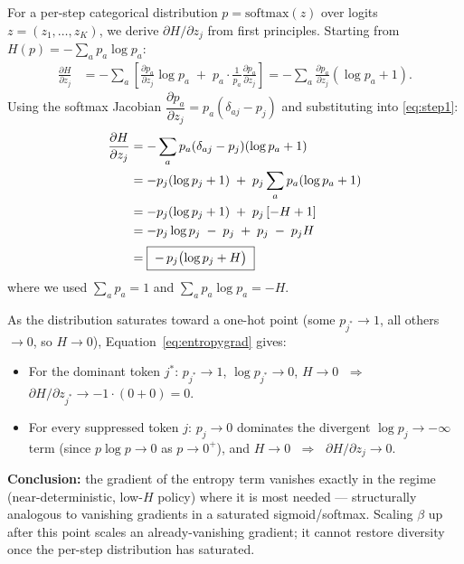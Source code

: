 \documentclass[11pt]{article}
\begin{document}
For a per-step categorical distribution $p = \mathrm{softmax}(z)$ over logits $z = (z_1, \ldots, z_K)$, we derive $\partial H/\partial z_j$ from first principles. Starting from $H(p) = -\sum_a p_a \log p_a$:
\begin{align}
  \frac{\partial H}{\partial z_j}
  &= -\sum_a \left[ \frac{\partial p_a}{\partial z_j} \log p_a \;+\; p_a \cdot \frac{1}{p_a}\frac{\partial p_a}{\partial z_j} \right]
  = -\sum_a \frac{\partial p_a}{\partial z_j}\left(\log p_a + 1\right). \label{eq:step1}
\end{align}
Using the softmax Jacobian $\dfrac{\partial p_a}{\partial z_j} = p_a\left(\delta_{aj} - p_j\right)$ and substituting into \eqref{eq:step1}:
\begin{align}
  \frac{\partial H}{\partial z_j}
  &= -\sum_a p_a(\delta_{aj} - p_j)(\log p_a + 1) \notag\\
  &= -p_j(\log p_j + 1) \;+\; p_j \sum_a p_a(\log p_a + 1) \notag\\
  &= -p_j(\log p_j + 1) \;+\; p_j\left[-H + 1\right] \notag\\
  &= -p_j \log p_j \;-\; p_j \;+\; p_j \;-\; p_j H \notag\\[2pt]
  &= \boxed{\;-\,p_j\bigl(\log p_j + H\bigr)\;} \label{eq:entropygrad}
\end{align}
where we used $\sum_a p_a = 1$ and $\sum_a p_a \log p_a = -H$.

As the distribution saturates toward a one-hot point (some $p_{j^*} \to 1$, all others $\to 0$, so $H \to 0$), Equation~\eqref{eq:entropygrad} gives:
\begin{itemize}
  \item For the dominant token $j^*$: $p_{j^*} \to 1$, $\log p_{j^*} \to 0$, $H \to 0$ $\;\Longrightarrow\;$ $\partial H/\partial z_{j^*} \to -1\cdot(0+0) = 0$.
  \item For every suppressed token $j$: $p_j \to 0$ dominates the divergent $\log p_j \to -\infty$ term (since $p\log p \to 0$ as $p\to 0^+$), and $H\to 0$ $\;\Longrightarrow\;$ $\partial H/\partial z_j \to 0$.
\end{itemize}

\textbf{Conclusion:} the gradient of the entropy term vanishes exactly in the regime (near-deterministic, low-$H$ policy) where it is most needed --- structurally analogous to vanishing gradients in a saturated sigmoid/softmax. Scaling $\beta$ up after this point scales an already-vanishing gradient; it cannot restore diversity once the per-step distribution has saturated.
\end{document}
